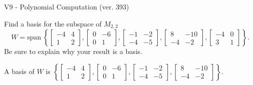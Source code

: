 \begin{exercise}
  \begin{exerciseTitle}V9 - Polynomial Computation (ver. 393)\end{exerciseTitle}
  \begin{exerciseStatement}
    Find a basis for the subspace of \(M_{2,2}\) 
\[W=\mathrm{span}\ \left\{\left[\begin{array}{cc}
-4 & 4 \\
1 & 2
\end{array}\right] , \left[\begin{array}{cc}
0 & -6 \\
0 & 1
\end{array}\right] , \left[\begin{array}{cc}
-1 & -2 \\
-4 & -5
\end{array}\right] , \left[\begin{array}{cc}
8 & -10 \\
-4 & -2
\end{array}\right] , \left[\begin{array}{cc}
-4 & 0 \\
3 & 1
\end{array}\right]\right\}.\]
 Be sure to explain why your result is a basis.


  \end{exerciseStatement}
  \begin{exerciseAnswer}
   A basis of \(W\) is  \(\left\{\left[\begin{array}{cc}
-4 & 4 \\
1 & 2
\end{array}\right] , \left[\begin{array}{cc}
0 & -6 \\
0 & 1
\end{array}\right] , \left[\begin{array}{cc}
-1 & -2 \\
-4 & -5
\end{array}\right] , \left[\begin{array}{cc}
8 & -10 \\
-4 & -2
\end{array}\right]\right\}\).
  


  \end{exerciseAnswer}
\end{exercise}